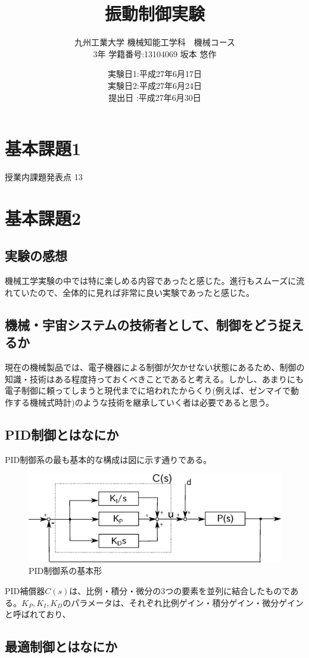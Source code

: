 \documentclass[a4j,twoside,openright,11pt]{jarticle}
\title{振動制御実験}
\author{九州工業大学 機械知能工学科　機械コース\\3年 学籍番号:13104069 坂本 悠作}
\date{
実験日1:平成27年6月17日\\
実験日2:平成27年6月24日\\
提出日 :平成27年6月30日
}
\begin{document}
\maketitle

\section{基本課題1}
授業内課題発表点 13
\newpage
\section{基本課題2}
\subsection{実験の感想}
機械工学実験の中では特に楽しめる内容であったと感じた。進行もスムーズに流れていたので、全体的に見れば非常に良い実験であったと感じた。
\subsection{機械・宇宙システムの技術者として、制御をどう捉えるか}
現在の機械製品では、電子機器による制御が欠かせない状態にあるため、制御の知識・技術はある程度持っておくべきことであると考える。しかし、あまりにも電子制御に頼ってしまうと現代までに培われたからくり(例えば、ゼンマイで動作する機械式時計)のような技術を継承していく者は必要であると思う。
\subsection{PID制御とはなにか}
PID制御系の最も基本的な構成は図に示す通りである。
\begin{figure}[htbp]
\begin{center}
\includegraphics[width=12cm]{PID1.eps}
\end{center}
\caption{PID制御系の基本形}
\end{figure}
PID補償器$C(s)$は、比例・積分・微分の3つの要素を並列に結合したものである。$K_P,K_I,K_D$のパラメータは、それぞれ比例ゲイン・積分ゲイン・微分ゲインと呼ばれており、
\subsection{最適制御とはなにか}
\end{document}
